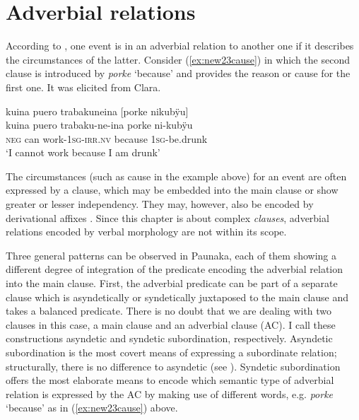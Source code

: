 
\section{Adverbial relations}\label{sec:AdverbialClauses}

According to \citet[155]{Cristofaro2003}, one event is in an adverbial relation to another one if it describes the circumstances of the latter. Consider (\ref{ex:new23cause}) in which the second clause is introduced by \textit{porke} ‘because’ and provides the reason or cause for the first one. It was elicited from Clara.

\ea\label{ex:new23cause}
\begingl
\glpreamble kuina puero trabakuneina \textup{[}porke nikubÿu\textup{]}\\
\gla kuina puero trabaku-ne-ina porke ni-kubÿu\\
\glb \textsc{neg} can work-1\textsc{sg}-\textsc{irr.nv} because 1\textsc{sg}-be.drunk\\
\glft ‘I cannot work because I am drunk’
\endgl
\trailingcitation{[cux-c120414ls-1.062-063]}
\xe

The circumstances (such as cause in the example above) for an event are often expressed by a clause, which may be embedded into the main clause or show greater or lesser independency. They may, however, also be encoded by derivational affixes \citep[192]{Lehmann1988}. Since this chapter is about complex \textit{clauses}, adverbial relations encoded by verbal morphology are not within its scope. 

Three general patterns can be observed in Paunaka, each of them showing a different degree of integration of the predicate encoding the adverbial relation into the main clause. First, the adverbial predicate can be part of a separate clause which is asyndetically or syndetically juxtaposed to the main clause and takes a balanced predicate. There is no doubt that we are dealing with two clauses in this case, a main clause and an adverbial clause (AC). I call these constructions asyndetic and syndetic subordination, respectively. Asyndetic subordination is the most covert means of expressing a subordinate relation; structurally, there is no difference to asyndetic  (see ). Syndetic subordination offers the most elaborate means to encode which semantic type of adverbial relation is expressed by the AC by making use of different  words, e.g. \textit{porke} ‘because’ as in (\ref{ex:new23cause}) above. 

